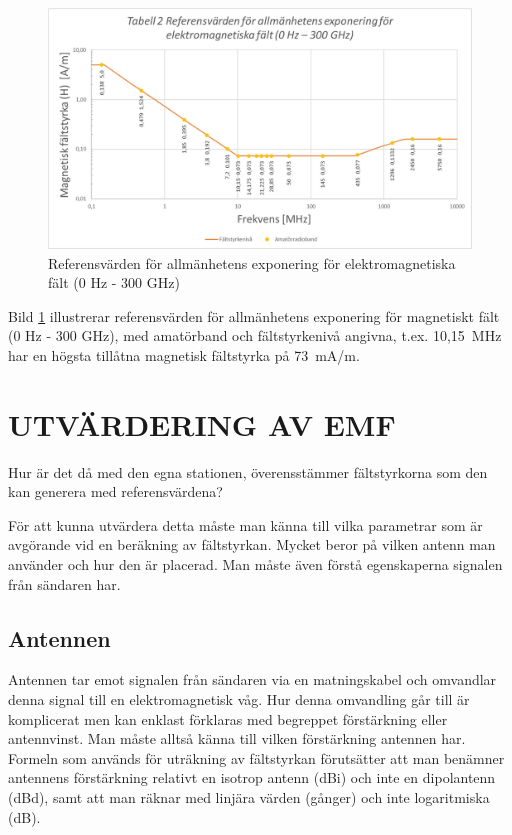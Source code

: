 \begin{figure}[h]
\begin{center}
\includegraphics[width=14cm]{images/emfbild-001}
\caption{Referensvärden för allmänhetens exponering för elektromagnetiska fält (0 Hz - 300 GHz)}
\label{fig:emf2}
\end{center}
\end{figure}

Bild \ref{fig:emf2} illustrerar referensvärden för allmänhetens
exponering för magnetiskt fält (0 Hz - 300 GHz), med amatörband
och fältstyrkenivå angivna, t.ex. 10,15~MHz har en högsta tillåtna
magnetisk fältstyrka på 73~mA/m.

\section{UTVÄRDERING AV EMF}

Hur är det då med den egna stationen, överensstämmer fältstyrkorna som
den kan generera med referensvärdena?

För att kunna utvärdera detta måste man känna till vilka parametrar
som är avgörande vid en beräkning av fältstyrkan. Mycket beror på
vilken antenn man använder och hur den är placerad.
Man måste även förstå egenskaperna signalen från sändaren har.

\subsection{Antennen}

Antennen tar emot signalen från sändaren via en matningskabel och
omvandlar denna signal till en elektromagnetisk våg. Hur denna
omvandling går till är komplicerat men kan enklast förklaras med
begreppet förstärkning eller antennvinst. Man måste alltså känna
till vilken förstärkning antennen har. Formeln som används för
uträkning av fältstyrkan förutsätter att man benämner antennens
förstärkning relativt en isotrop antenn (dBi) och inte en
dipolantenn (dBd), samt att man räknar med linjära värden (gånger)
och inte logaritmiska (dB).

